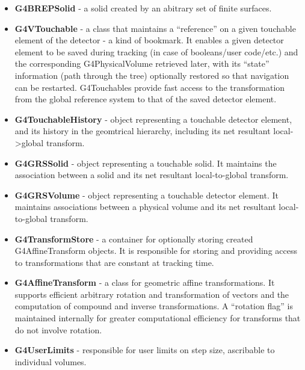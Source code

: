 \begin{itemize}
\item {\bf G4BREPSolid} -
   a solid created by an abitrary set of finite surfaces. 

\item {\bf G4VTouchable} -
   a class that maintains a ``reference'' on a given touchable element of 
   the detector - a kind of bookmark.  It enables a given detector element 
   to be saved during tracking (in case of booleans/user code/etc.) and the 
   corresponding G4PhysicalVolume retrieved later, with its ``state''
   information (path through the tree) optionally restored so that 
   navigation can be restarted.  G4Touchables provide fast access to the 
   transformation from the global reference system to that of the saved 
   detector element. 

\item {\bf G4TouchableHistory} -
   object representing a touchable detector element, and its history in the 
   geomtrical hierarchy, including its net resultant local->global transform.
 
\item {\bf G4GRSSolid} - object representing a touchable solid.  It maintains 
   the association between a solid and its net resultant local-to-global 
   transform.
 
\item {\bf G4GRSVolume} - object representing a touchable detector element.  
   It maintains associations between a physical volume and its net resultant 
   local-to-global transform. 

\item {\bf G4TransformStore} -
   a container for optionally storing created G4AffineTransform objects. 
   It is responsible for storing and providing access to transformations 
   that are constant at tracking time.
 
\item {\bf G4AffineTransform} - a class for geometric affine transformations. 
   It supports efficient arbitrary rotation and transformation of vectors and 
   the computation of compound and inverse transformations.  A 
   ``rotation flag'' is maintained internally for greater computational 
   efficiency for transforms that do not involve rotation.
 
\item {\bf G4UserLimits} -
   responsible for user limits on step size, ascribable to individual volumes. 

\end{itemize}

